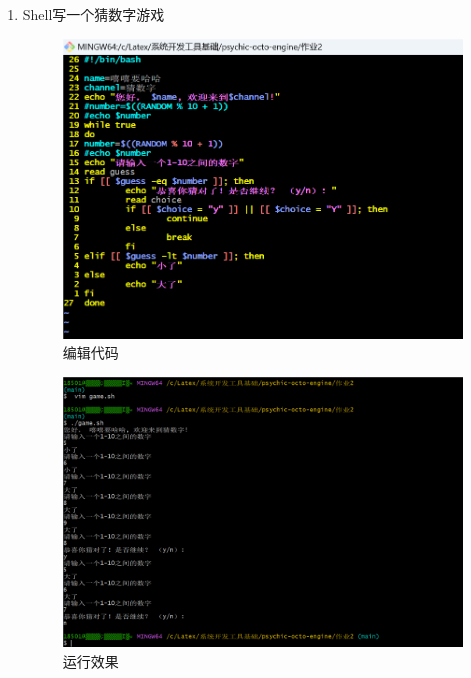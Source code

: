 \documentclass{ctexart}
\begin{document}
\begin{enumerate}
\item Shell写一个猜数字游戏
 \begin{figure}[H]
    \centering
    \includegraphics[width=12cm]{67c896cf1a6bfa021dca165852c2e7ca.png}
    \caption{编辑代码}
    \label{fig:3}
\end{figure}
\begin{figure}[H]
    \centering
    \includegraphics[width=12cm]{cfac9adf2cf508af7504105c35e1d837.png}
    \caption{运行效果}
    \label{fig:3}
\end{figure}
\end{enumerate}
\end{document}
